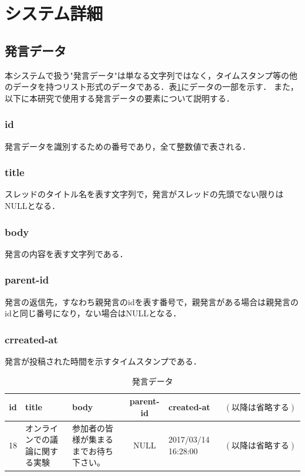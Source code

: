 \section{システム詳細}
\label{model:detail}
\subsection{発言データ}
本システムで扱う"発言データ"は単なる文字列ではなく，タイムスタンプ等の他のデータを持つリスト形式のデータである．表\ref{table:remarkData}にデータの一部を示す．
また，以下に本研究で使用する発言データの要素について説明する．
\subsubsection*{ id}
発言データを識別するための番号であり，全て整数値で表される．
\subsubsection*{ title}
スレッドのタイトル名を表す文字列で，発言がスレッドの先頭でない限りはNULLとなる．
\subsubsection*{ body}
発言の内容を表す文字列である．
\subsubsection*{ parent-id}
発言の返信先，すなわち親発言のidを表す番号で，親発言がある場合は親発言のidと同じ番号になり，ない場合はNULLとなる．
\subsubsection*{ crreated-at}
発言が投稿された時間を示すタイムスタンプである．

\begin{table}[htbp]
  \begin{tabular}{| c | p{4cm} | p{4cm} | c | p{2cm} | c |} \hline
     id & title & body & parent-id & created-at & $(以降は省略する)$ \\ \hline
     18 & オンラインでの議論に関する実験 &  参加者の皆様が集まるまでお待ち下さい。 & NULL & 2017/03/14 16:28:00 & $(以降は省略する)$ \\
     \hline
  \end{tabular}
  \caption{発言データ} \label{table:remarkData}
\end{table}

